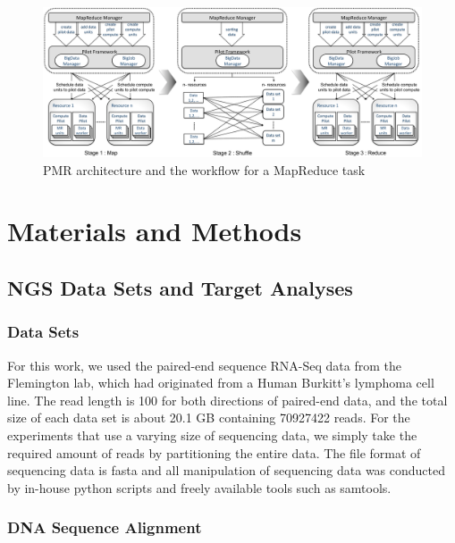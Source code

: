 \documentclass{sig-alternate}
\begin{document}
\begin{center}
\hfill{}
\begin{figure}
 \centering
\includegraphics[scale=0.35]{figures/F1_1.pdf} 
\hfill{}
\caption{\small PMR architecture and the workflow for a MapReduce task}
  \label{fig:arch-pj-saga-mr} 
\end{figure}
\end{center}


\section{Materials and Methods}\label{sec:materials_and_methods}
\subsection{NGS Data Sets and Target Analyses}
\subsubsection{Data Sets}

For this work, we used the paired-end sequence RNA-Seq data from the Flemington lab, which had originated from a Human Burkitt's lymphoma cell line\cite{erik_2010}.  The read length is 100 for both directions of paired-end data, and the total size of each data set is about 20.1 GB containing 70927422 reads.  For the experiments that use a varying size of sequencing data, we simply take the required amount of reads by partitioning the entire data.  The file format of sequencing data is fasta and all manipulation of sequencing data was conducted by in-house python scripts and freely available tools such as samtools\cite{samtools}.  

\subsubsection{DNA Sequence Alignment}
\end{document}
